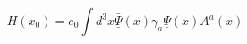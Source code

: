 \begin{equation}
H(x_0)
=
e_0 \int d^3x 
\underline{\bar\Psi}(x)\gamma_a\underline{\Psi}(x)
A^a(x)
\end{equation}

